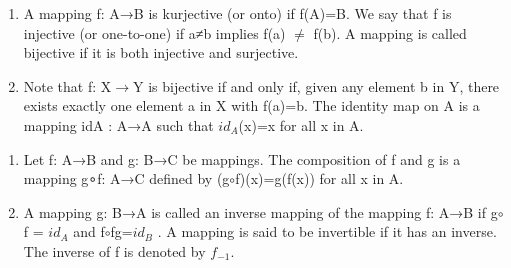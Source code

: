 \documentclass[cn,10pt,math=newtx,citestyle=gb7714-2015,bibstyle=gb7714-2015]{elegantbook}
\begin{document}
\begin{definition}
\begin{enumerate}
    \item A mapping f: A→B is kurjective (or onto) if f(A)=B. 
We say that f is injective (or one-to-one) if a≠b
implies f(a) $\neq$ f(b). A mapping is called bijective if it 
is both injective and surjective.
    \item Note that f: X$\to$Y is bijective if and only if, given 
any element b in Y, there exists exactly one element 
a in X with f(a)=b. The identity map on A is a 
mapping idA
: A→A such that $id_A$(x)=x for all x in A.
\end{enumerate}
\end{definition}


\begin{definition}
\begin{enumerate}
    \item Let f: A→B and g: B→C be mappings. The 
composition of f and g is a mapping g∘f: A→C
defined by (g$\circ$f)(x)=g(f(x)) for all x in A.
    \item A mapping g: B→A is called an inverse mapping of 
the mapping f: A→B if g$\circ$f = $id_A$
and f$\circ$fg=$id_B$
. A 
mapping is said to be invertible if it has an inverse. 
The inverse of f is denoted by $f_{-1}$.
\end{enumerate}
\end{definition}
    
\end{document}
